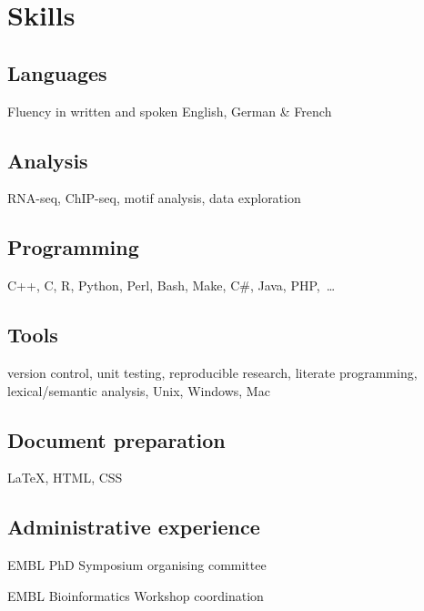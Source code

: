 \documentclass{klmr-cv}
\newcommand*\csharp{C\#}
\newcommand*\cpp{C++}
\begin{document}
\section{Skills}

\subsection{Languages}

\item{Fluency in written and spoken English, German \& French}

\subsection{Analysis}

\item{RNA-seq, ChIP-seq, motif analysis, data exploration}

\subsection{Programming}

\item{\cpp, C, R, Python, Perl, Bash, Make, \csharp, Java, PHP,~…}

\subsection{Tools}

\item{version control, unit testing, reproducible research, literate
    programming, lexical/semantic analysis, Unix, Windows, Mac}

\subsection{Document preparation}

\item{\LaTeX, HTML, CSS}

\subsection{Administrative experience}

\item{EMBL PhD Symposium organising committee}
\item{EMBL Bioinformatics Workshop coordination}

\body
\end{document}

